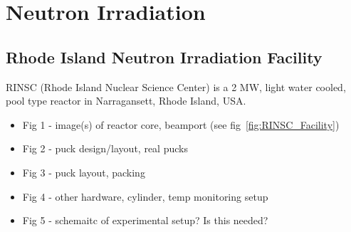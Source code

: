 \section{Neutron Irradiation}
\label{sec:irradiation}

\subsection{Rhode Island Neutron Irradiation Facility}
\label{subsec:RINSC}
RINSC (Rhode Island Nuclear Science Center) is a 2 MW, light water cooled, pool type reactor in Narragansett, Rhode Island, USA.
\begin{itemize}
    \item Fig 1 - image(s) of reactor core, beamport (see fig~\ref{fig:RINSC_Facility})
    \item Fig 2 - puck design/layout, real pucks
    \item Fig 3 - puck layout, packing
    \item Fig 4 - other hardware, cylinder, temp monitoring setup
    \item Fig 5 - schemaitc of experimental setup? Is this needed?
\end{itemize}

